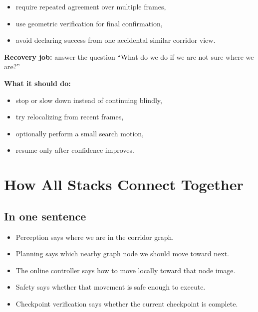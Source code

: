 \documentclass[11pt,a4paper]{article}
\begin{document}
\begin{itemize}[nosep]
  \item require repeated agreement over multiple frames,
  \item use geometric verification for final confirmation,
  \item avoid declaring success from one accidental similar corridor view.
\end{itemize}

\textbf{Recovery job:} answer the question ``What do we do if we are not sure where we are?''

\textbf{What it should do:}

\begin{itemize}[nosep]
  \item stop or slow down instead of continuing blindly,
  \item try relocalizing from recent frames,
  \item optionally perform a small search motion,
  \item resume only after confidence improves.
\end{itemize}


\section{How All Stacks Connect Together}

\begin{center}
\end{center}

\subsection*{In one sentence}

\begin{itemize}[nosep]
  \item Perception says where we are in the corridor graph.
  \item Planning says which nearby graph node we should move toward next.
  \item The online controller says how to move locally toward that node image.
  \item Safety says whether that movement is safe enough to execute.
  \item Checkpoint verification says whether the current checkpoint is complete.
\end{itemize}
\end{document}
